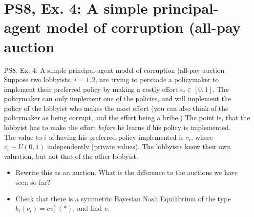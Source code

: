 \section{PS8, Ex. 4: A simple principal-agent model of corruption (all-pay auction}

\begin{frame}{PS8, Ex. 4: A simple principal-agent model of corruption (all-pay auction}
    Suppose two lobbyists, $i = 1, 2$, are trying to persuade a policymaker to implement their preferred policy by making a costly effort $e_i\in[0, 1]$. The policymaker can only implement one of the policies, and will implement the policy of the lobbyist who makes the most effort (you can also think of the policymaker as being corrupt, and the effort being a bribe.) The point is, that the lobbyist has to make the effort \textit{before} he learns if his policy is implemented.\\\medskip
    The value to $i$ of having his preferred policy implemented is $v_i$, where $v_i\sim U(0, 1)$ independently (private values). The lobbyists know their own valuation, but not that of the other lobbyist.
    \begin{itemize}
      \item[(a)] Rewrite this as an auction. What is the difference to the auctions we have seen so far?
      \item[(b)] Check that there is a symmetric Bayesian Nash Equilibrium of the type $b_i(v_i) = cv_i^2\ (*)$, and find \textit{c}.
    \end{itemize}
\end{frame}

